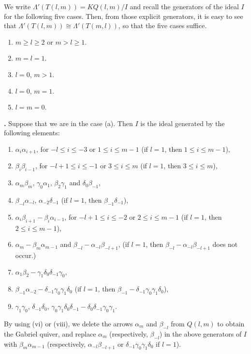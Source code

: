 \documentclass[12pt]{amsart}
\def \para{\refstepcounter{thm} \par\medskip\noindent
                \textbf{\thethm .} }
\numberwithin{equation}{thm}
\begin{document}
We write $\Lambda'(T(l,m))=KQ(l,m)/I$ and recall the generators of the ideal $I$ for the following five cases. 
Then, from those explicit generators, it is easy to see that $\Lambda'(T(l,m))\cong \Lambda'(T(m,l))$, so that the five cases suffice. 

\begin{enumerate}
\item[(a)] $m\ge l\ge 2$ or $m>l\geq 1$.
\item[(b)] $m=l=1$.
\item[(c)] $l=0$, $m>1$.
\item[(d)] $l=0$, $m=1$.
\item[(e)] $l=m=0$.
\end{enumerate}

\para
Suppose that we are in the case (a). Then $I$ is the ideal generated by the following elements:
\begin{enumerate}
\item $\alpha_i\alpha_{i+1}$, for $-l\leq i\leq -3$ or $1\leq i\leq m-1$ (if $l=1$, then $1\leq i\leq m-1$), 
\item $\beta_i\beta_{i-1}$, for $-l+1\leq i\leq -1$ or $3\leq i\leq m$ (if $l=1$, then $3\leq i\leq m$), 
\item $\alpha_m\beta_m$, $\gamma_0\alpha_1$, $\beta_2\gamma_1$ and $\delta_0\beta_{-1}$,
\item $\beta_{-l}\alpha_{-l}$, $\alpha_{-2}\delta_{-1}$ (if $l=1$, then $\beta_{-1}\delta_{-1}$),
\item $\alpha_i\beta_{i+1}-\beta_i\alpha_{i-1}$, for $-l+1\leq i\leq -2$ or $2\leq i\leq m-1$ (if $l=1$, then $2\leq i\leq m-1$), 
\item $\alpha_m-\beta_m\alpha_{m-1}$ and $\beta_{-l}-\alpha_{-l}\beta_{-l+1}$, (if $l=1$, then $\beta_{-l}-\alpha_{-l}\beta_{-l+1}$ does not occur.)
\item $\alpha_{1}\beta_{2}-\gamma_{1}\delta_{0}\delta_{-1}\gamma_{0}$,
\item $\beta_{-1}\alpha_{-2}-\delta_{-1}\gamma_0\gamma_1\delta_0$ (if $l=1$, then $\beta_{-1}-\delta_{-1}\gamma_0\gamma_1\delta_0$),
\item $\gamma_{1}\gamma_{0}$, $\delta_{-1}\delta_{0}$, $\gamma_{0}\gamma_{1}\delta_{0}\delta_{-1}-\delta_{0}\delta_{-1}\gamma_{0}\gamma_{1}$.
\end{enumerate}
By using (vi) or (viii), we delete the arrows $\alpha_{m}$ and $\beta_{-l}$ from $Q(l,m)$ 
to obtain the Gabriel quiver, 
and replace $\alpha_m$ (respectively, $\beta_{-l}$) in the above generators of $I$ with 
$\beta_m\alpha_{m-1}$ (respectively, $\alpha_{-l}\beta_{-l+1}$ or $\delta_{-1}\gamma_0\gamma_1\delta_0$ if $l=1$). 
\end{document}

